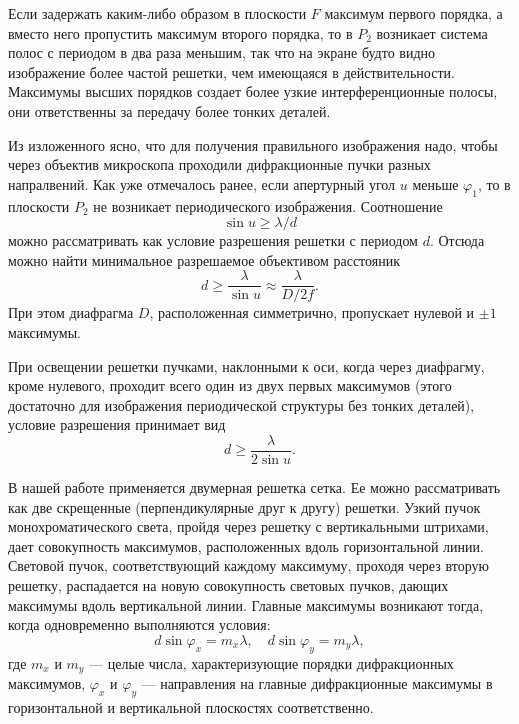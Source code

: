 \documentclass[a4paper, 12pt]{article}
\begin{document}
	Если задержать каким-либо образом в плоскости $F$ максимум первого порядка, а вместо него пропустить максимум второго порядка, то в $P_2$ возникает система полос с периодом в два раза меньшим, так что на экране будто видно изображение более частой решетки, чем имеющаяся в действительности. Максимумы высших порядков создает более узкие интерференционные полосы, они ответственны за передачу более тонких деталей.\par
	Из изложенного ясно, что для получения правильного изображения надо, чтобы через объектив микроскопа проходили дифракционные пучки разных напралвений. Как уже отмечалось ранее, если апертурный угол $u$ меньше $\varphi_1$, то в плоскости $P_2$ не возникает периодического изображения. Соотношение
	\begin{equation}
		\sin u\geqslant\lambda/d
	\end{equation}
	можно рассматривать как условие разрешения решетки с периодом $d$. Отсюда можно найти минимальное разрешаемое объективом расстояник
	\begin{equation}
		d\geqslant\frac{\lambda}{\sin u}\approx\frac{\lambda}{D/2f}.
		\label{eq:8}
	\end{equation}
	При этом диафрагма $D$, расположенная симметрично, пропускает нулевой и $\pm 1$ максимумы.\par
	При освещении решетки пучками, наклонными к оси, когда через диафрагму, кроме нулевого, проходит всего один из двух первых максимумов (этого достаточно для изображения периодической структуры без тонких деталей), условие разрешения принимает вид
	\begin{equation*}
		d\geqslant\frac{\lambda}{2\sin u}.
	\end{equation*}\par
	В нашей работе применяется двумерная решетка сетка. Ее можно рассматривать как две скрещенные (перпендикулярные друг к другу) решетки. Узкий пучок монохроматического света, пройдя через решетку с вертикальными штрихами, дает совокупность максимумов, расположенных вдоль горизонтальной линии. Световой пучок, соответствующий каждому максимуму, проходя через вторую решетку, распадается на новую совокупность световых пучков, дающих максимумы вдоль вертикальной линии. Главные максимумы возникают тогда, когда одновременно выполняются условия:
	\begin{equation}
		d\sin\varphi_x=m_x\lambda,\quad d\sin\varphi_y=m_y\lambda,
	\end{equation}
	где $m_x$ и $m_y$ — целые числа, характеризующие порядки дифракционных максимумов, $\varphi_x$ и $\varphi_y$ — направления на главные дифракционные максимумы в горизонтальной и вертикальной плоскостях соответственно.\par
\end{document}
